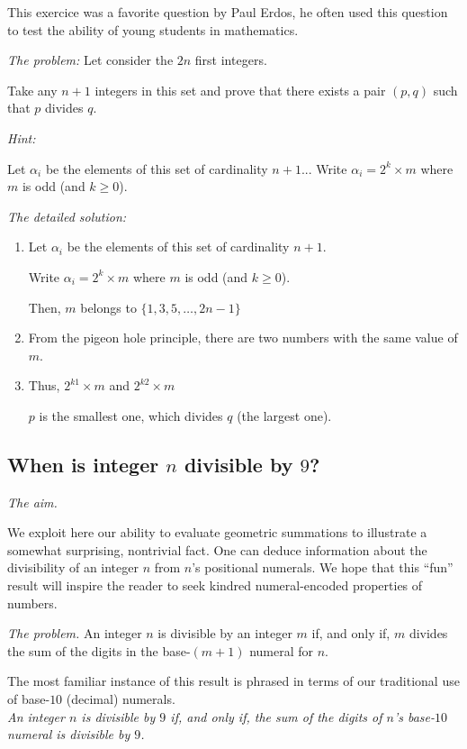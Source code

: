 This exercice was a favorite question by Paul Erdos,
he often used this question to test the ability of young students in mathematics. 
\medskip

\noindent \textit{The problem:}
Let consider the $2n$ first integers.

Take any $n+1$ integers in this set and prove that there exists a pair $(p,q)$
such that $p$ divides $q$. 
\medskip

\noindent \textit{Hint:}

Let $\alpha_i$ be the elements of this set of cardinality $n+1$...
Write $\alpha_i = 2^k \times m$ where $m$ is odd (and $k \geq 0$).
\medskip

\noindent \textit{The detailed solution:}

\begin{enumerate}
\item
Let $\alpha_i$ be the elements of this set of cardinality $n+1$.

Write $\alpha_i = 2^k \times m$ where $m$ is odd (and $k \geq 0$).

Then, $m$ belongs to $\{1,3,5, \ldots, 2n-1 \}$
\item
From the pigeon hole principle, there are two numbers with the same value of $m$. 
\item 
Thus, $2^{k1} \times m$ and $2^{k2} \times m$

$p$ is the smallest one, which divides $q$ (the largest one).
\end{enumerate}


\subsection{When is integer $n$ divisible by $9$?}
\label{sec:divisible-by-9}

\noindent \textit{The aim.}

We exploit here our ability to evaluate geometric summations to
illustrate a somewhat surprising, nontrivial fact.  One can deduce
information about the divisibility of an integer $n$ from $n$'s
positional numerals.  We hope that this ``fun'' result will inspire
the reader to seek kindred numeral-encoded properties of numbers.

\medskip
\noindent \textit{The problem.}
An integer $n$ is divisible by an integer $m$ if, and only if, $m$
divides the sum of the digits in the base-$(m+1)$ numeral for $n$.
\medskip

The most familiar instance of this result is phrased in terms of our
traditional use of base-$10$ (decimal) numerals. \\
{\it An integer $n$ is divisible by $9$ if, and only if, the sum of
  the digits of $n$'s base-$10$ numeral is divisible by $9$.}
\medskip


